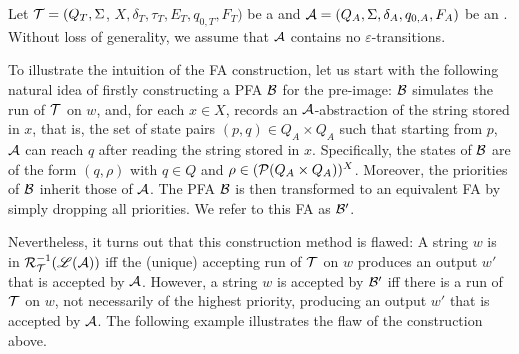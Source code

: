  
Let $\mathcal{T} = (Q_T, \Sigma$, $X, \delta_T, \tau_T, E_T,  q_{0, T}, F_T)$ be a \PSST{}  and $\mathcal{A}
  = (Q_A, \Sigma, \delta_A, q_{0, A}, F_A)$ be an \FA{}. Without loss of generality, we assume that $\mathcal{A}$ contains no $\varepsilon$-transitions. 

To illustrate the intuition of the FA construction, let us start with the following natural idea of firstly constructing a PFA $\mathcal{B}$ for the pre-image: $\mathcal{B}$ simulates the run of $\mathcal{T}$ on $w$, and, for each $x \in X$, records an $\mathcal{A}$-abstraction of the string stored in $x$, that is, the set of state pairs $(p, q) \in Q_A \times Q_A$ such that starting from $p$, $\mathcal{A}$ can reach $q$ after reading the string stored in $x$. Specifically, the states of $\mathcal{B}$ are of the form $(q, \rho)$ with $q \in Q$ and $\rho \in (\mathcal{P}(Q_A \times Q_A ))^{X}$. Moreover, the priorities of $\mathcal{B}$ inherit those of $\mathcal{A}$. The PFA $\mathcal{B}$ is then transformed to an equivalent FA by simply dropping all priorities. We refer to this FA as $\mathcal{B}'$.

Nevertheless, it turns out that this construction method is flawed: A string $w$ is in $\mathcal{R}^{-1}_{\mathcal{T}}(\mathscr{L}(\mathcal{A}))$ iff the (unique) accepting run of $\mathcal{T}$ on $w$ produces an output $w'$ that is accepted by $\mathcal{A}$. However, a string $w$ is accepted by $\mathcal{B}'$ iff there is a run of $\mathcal{T}$ on $w$, not necessarily of the highest priority, producing an output $w'$ that is accepted by $\mathcal{A}$. The following example illustrates the flaw of the construction above.

